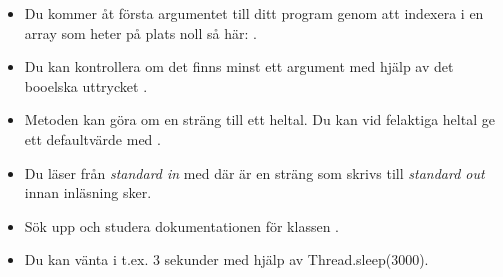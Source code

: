 \begin{itemize}
\item Du kommer åt första argumentet till ditt program genom att indexera i en array som heter  på plats noll så här: .
\item Du kan kontrollera om det finns minst ett argument med hjälp av det booelska uttrycket .
\item Metoden  kan göra om en sträng till ett heltal. Du kan vid felaktiga heltal ge ett defaultvärde med .
\item Du läser från \textit{standard in} med  där  är en sträng som skrivs till \textit{standard out} innan inläsning sker.
\item Sök upp och studera dokumentationen för klassen . 
\item Du kan vänta i t.ex. 3 sekunder med hjälp av Thread.sleep(3000).
\end{itemize}




